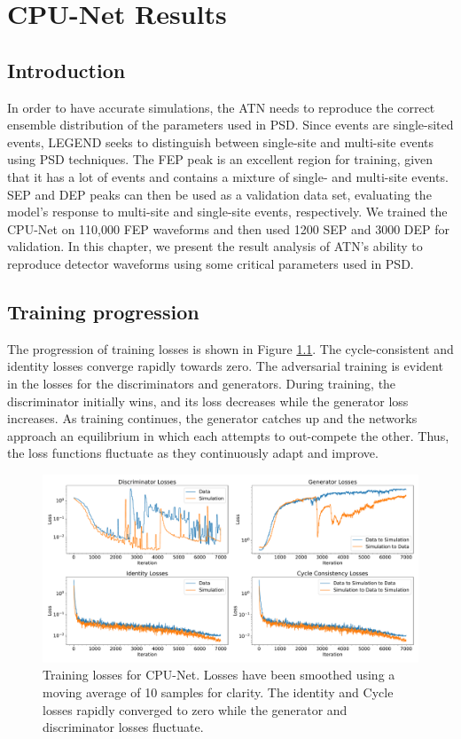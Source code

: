 \chapter{CPU-Net Results}\label{chap:cpu-net_result}

\section{Introduction}

In order to have accurate simulations, the ATN needs to reproduce the correct ensemble distribution of the parameters used in PSD. Since {\onbb} events are single-sited events, LEGEND seeks to distinguish between single-site and multi-site events using PSD techniques. The FEP peak is an excellent region for training, given that it has a lot of events and contains a mixture of single- and multi-site events. SEP and DEP peaks can then be used as a validation data set, evaluating the model's response to multi-site and single-site events, respectively. We trained the CPU-Net on 110,000 FEP waveforms and then used 1200 SEP and 3000 DEP for validation. In this chapter, we present the result analysis of ATN's ability to reproduce detector waveforms using some critical parameters used in PSD. 



\section{Training progression}
The progression of training losses is shown in Figure \ref{fig:training_loss}. The cycle-consistent and identity losses converge rapidly towards zero. The adversarial training is evident in the losses for the discriminators and generators. During training, the discriminator initially wins, and its loss decreases while the generator loss increases. As training continues, the generator catches up and the networks approach an equilibrium in which each attempts to out-compete the other. Thus, the loss functions fluctuate as they continuously adapt and improve.


\begin{figure}%
    \includegraphics[width=0.99\linewidth]{ch8/figs/loss_funcs.pdf}
    \caption{Training losses for CPU-Net. Losses have been smoothed using a moving average of 10 samples for clarity. The identity and Cycle losses rapidly converged to zero while the generator and discriminator losses fluctuate.} 
   \label{fig:training_loss}
\end{figure}

